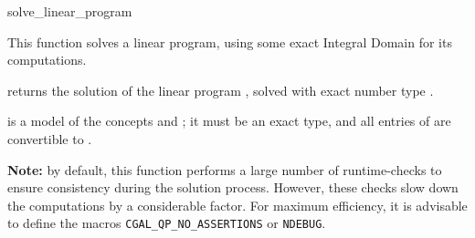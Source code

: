 \begin{ccRefFunction}{solve_linear_program}


This function solves a linear program, using some exact
Integral Domain  for its computations.   

{returns the solution of the linear program , solved
with exact number type .}

 is a model of the concepts  and
; it must
be an exact type, and all entries of  are convertible to 
.

{\bf Note:} by default, this function performs a large number of 
runtime-checks to ensure consistency during the solution process.
However, these checks slow down the computations by a considerable
factor. For maximum efficiency, it is advisable to define the macros
\texttt{CGAL\_QP\_NO\_ASSERTIONS} or \texttt{NDEBUG}.
\end{ccRefFunction}
